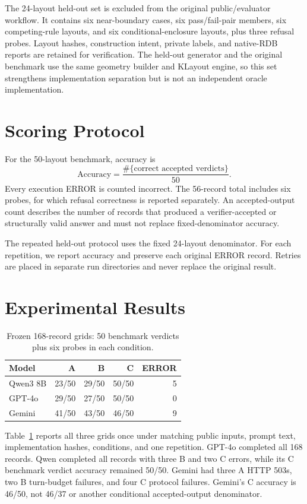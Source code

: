\documentclass[10pt,twocolumn]{article}
\begin{document}
The 24-layout held-out set is excluded from the original public/evaluator workflow.
It contains six near-boundary cases, six pass/fail-pair members, six competing-rule
layouts, and six conditional-enclosure layouts, plus three refusal probes. Layout
hashes, construction intent, private labels, and native-RDB reports are retained
for verification. The held-out generator and the original benchmark use the same
geometry builder and KLayout engine, so this set strengthens implementation
separation but is not an independent oracle implementation.

\section{Scoring Protocol}
For the 50-layout benchmark, accuracy is
\[
\mathrm{Accuracy}=\frac{\#\{\text{correct accepted verdicts}\}}{50}.
\]
Every execution ERROR is counted incorrect. The 56-record total includes six probes,
for which refusal correctness is reported separately. An accepted-output count
describes the number of records that produced a verifier-accepted or structurally
valid answer and must not replace fixed-denominator accuracy.

The repeated held-out protocol uses the fixed 24-layout denominator. For each
repetition, we report accuracy and preserve each original ERROR record.
Retries are placed in separate run directories and never replace the original result.

\section{Experimental Results}
\begin{table}[t]
\centering
\caption{Frozen 168-record grids: 50 benchmark verdicts plus six probes in each condition.}
\label{tab:results}
\small
\begin{tabular}{lrrrr}
\toprule
Model & A & B & C & ERROR \\
\midrule
Qwen3 8B & 23/50 & 29/50 & 50/50 & 5 \\
GPT-4o & 29/50 & 27/50 & 50/50 & 0 \\
Gemini & 41/50 & 43/50 & 46/50 & 9 \\
\bottomrule
\end{tabular}
\end{table}

Table~\ref{tab:results} reports all three grids once under matching public inputs,
prompt text, implementation hashes, conditions, and one repetition. GPT-4o completed
all 168 records. Qwen completed all records with three B and two C errors, while its
C benchmark verdict accuracy remained 50/50. Gemini had three A HTTP 503s, two B
turn-budget failures, and four C protocol failures. Gemini's C accuracy is 46/50,
not 46/37 or another conditional accepted-output denominator.
\end{document}
